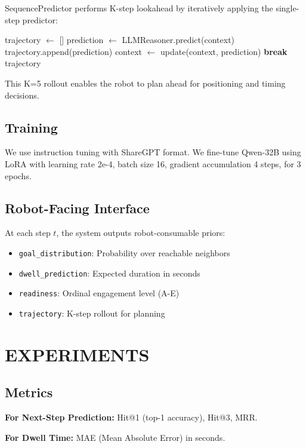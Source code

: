 \documentclass{letterpaper,article}
\begin{document}
SequencePredictor performs K-step lookahead by iteratively applying the single-step predictor:
\begin{algorithmic}
\STATE trajectory $\leftarrow$ []
    \STATE prediction $\leftarrow$ LLMReasoner.predict(context)
    \STATE trajectory.append(prediction)
    \STATE context $\leftarrow$ update(context, prediction)
     \textbf{break} \ENDIF
\ENDFOR
\RETURN trajectory
\end{algorithmic}

This K=5 rollout enables the robot to plan ahead for positioning and timing decisions.

\subsection{Training}

We use instruction tuning with ShareGPT format. We fine-tune Qwen-32B using LoRA with learning rate 2e-4, batch size 16, gradient accumulation 4 steps, for 3 epochs.

\subsection{Robot-Facing Interface}

At each step $t$, the system outputs robot-consumable priors:
\begin{itemize}
    \item \texttt{goal\_distribution}: Probability over reachable neighbors
    \item \texttt{dwell\_prediction}: Expected duration in seconds
    \item \texttt{readiness}: Ordinal engagement level (A-E)
    \item \texttt{trajectory}: K-step rollout for planning
\end{itemize}

\section{EXPERIMENTS}

\subsection{Metrics}

\textbf{For Next-Step Prediction:} Hit@1 (top-1 accuracy), Hit@3, MRR.

\textbf{For Dwell Time:} MAE (Mean Absolute Error) in seconds.
\end{document}
